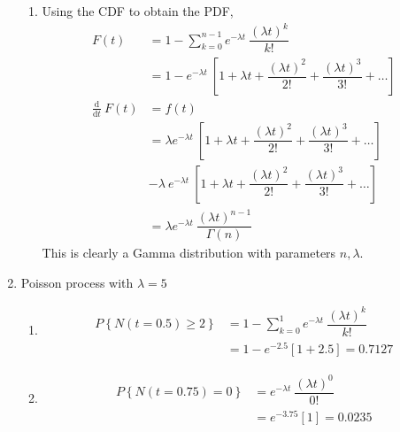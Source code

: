 \begin{enumerate}
\begin{enumerate}
			\item Using the CDF to obtain the PDF,
			\begin{align}
				F(t) &=  1 - \sum\limits_{k=0}^{n-1} e^{-\lambda t}\ \dfrac{(\lambda t)^k}{k!} \nonumber \\
				&=  1 - e^{-\lambda t}\ \left[1 + \lambda t + \dfrac{(\lambda t)^2}{2!} + \dfrac{(\lambda t)^3}{3!} + \dots\right] \nonumber \\
				\frac{\mathrm{d}}{\mathrm{d}t}\ F(t) &= f(t) \nonumber \\
				&= \lambda e^{-\lambda t}\ \left[1 + \lambda t + \dfrac{(\lambda t)^2}{2!} + \dfrac{(\lambda t)^3}{3!} + \dots\right] \nonumber \\
				&- \lambda\ e^{-\lambda t}\ \left[1 + \lambda t + \dfrac{(\lambda t)^2}{2!} + \dfrac{(\lambda t)^3}{3!} + \dots\right] \\
				&= \lambda e^{-\lambda t}\ \dfrac{(\lambda t)^{n-1}}{\Gamma (n)}
			\end{align}
			This is clearly a Gamma distribution with parameters $ n, \lambda $.
		\end{enumerate}
	
	
	\item Poisson process with $ \lambda = 5 $
			
		\begin{enumerate}
			\item
			\begin{align}
				P \left\{N(t = 0.5) \geq 2\right\} &= 1 - \sum\limits_{k=0}^{1} e^{-\lambda t}\ \dfrac{(\lambda t)^k}{k!} \nonumber \\
				&= 1 - e^{-2.5} \left[1 + 2.5\right]= 0.7127
			\end{align}
			
			\item
			\begin{align}
				P \left\{N(t = 0.75) = 0\right\} &= e^{-\lambda t}\ \dfrac{(\lambda t)^0}{0!} \nonumber \\
				&= e^{-3.75} \left[1\right]= 0.0235
			\end{align}
			

\end{enumerate}
\end{enumerate}

